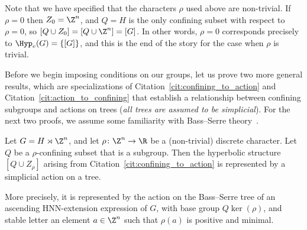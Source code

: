 Note that we have specified that the characters $\rho$ used above are non-trivial. If $\rho=0$ then $Z_0=\Z^n$, and $Q=H$ is the only confining subset with respect to $\rho=0$, so $[Q\cup Z_0]=[Q\cup \Z^n]=[G]$. In other words, $\rho=0$ corresponds precisely to $\Hyp_e(G)=\{[G]\}$, and this is the end of the story for the case when $\rho$ is trivial.

Before we begin imposing conditions on our groups, let us prove two more general results, which are specializations of Citation~\ref{cit:confining_to_action} and Citation~\ref{cit:action_to_confining} that establish a relationship between confining subgroups and actions on trees (\emph{all trees are assumed to be simplicial}). For the next two proofs, we assume some familiarity with Bass--Serre theory~\cite{serre}.

\begin{prop}\label{prop:subgroups_to_trees}
Let $G=H\rtimes \Z^n$, and let $\rho\colon \Z^n\to \R$ be a (non-trivial) discrete character. Let $Q$ be a $\rho$-confining subset that is a subgroup. Then the hyperbolic structure $[Q\cup Z_\rho]$ arising from Citation~\ref{cit:confining_to_action} is represented by a simplicial action on a tree.

More precisely, it is represented by the action on the Bass--Serre tree of an ascending HNN-extension expression of $G$, with base group $Q \ker(\rho)$, and stable letter an element $a \in \Z^n$ such that $\rho(a)$ is positive and minimal.
\end{prop}


